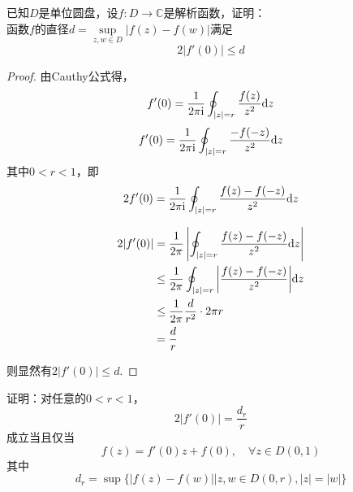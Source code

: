 \begin{proposition}

    已知$D$是单位圆盘，设$f:D\to\mathbb{C}$是解析函数，证明：\\
    函数$f$的直径$d =\sup\limits_{z,w\in D}{|f(z) - f(w)|}$满足
    $$2|f'(0)| \leq d$$

\end{proposition}

\begin{proof}

    由\textup{Cauthy}公式得，
    $$f'(0) = \dfrac{1}{2\pi \mathrm{i}} \oint_{|z| = r}{\dfrac{f(z)}{z^2}}\mathrm{d} z$$
    $$f'(0) = \dfrac{1}{2\pi \mathrm{i}} \oint_{|z| = r}{\dfrac{-f(-z)}{z^2}}\mathrm{d} z$$
    其中$0 < r < 1$，即
    $$2f'(0) = \dfrac{1}{2\pi \mathrm{i}} \oint_{|z| = r}{\dfrac{f(z)-f(-z)}{z^2}}\mathrm{d} z$$

    \begin{align*}
        2|f'(0)| & = \dfrac{1}{2 \pi} \left| \oint_{|z| = r}{\dfrac{f(z)-f(-z)}{z^2}}\mathrm{d} z \right| \\
        & \leq \dfrac{1}{2 \pi} \oint_{|z|=r}{\left|\dfrac{f(z)-f(-z)}{z^2}\right|}\mathrm{d} z\\
        & \leq \dfrac{1}{2 \pi} \dfrac{d}{r^2} \cdot 2 \pi r\\
        & = \dfrac{d}{r}
    \end{align*}

    则显然有$2|f'(0)| \leq d$.

\end{proof}

\begin{theorem}\label{theorem:complex}

    证明：对任意的$0 < r < 1$，
    $$2|f'(0)| = \dfrac{d_r}{r}$$
    成立当且仅当
    $$f(z) = f'(0)z + f(0), \quad \forall z \in D(0,1)$$
    其中
    $$d_r = \sup\{|f(z) - f(w)|\big| z,w \in D(0,r), |z| = |w|\}$$
    
\end{theorem}

